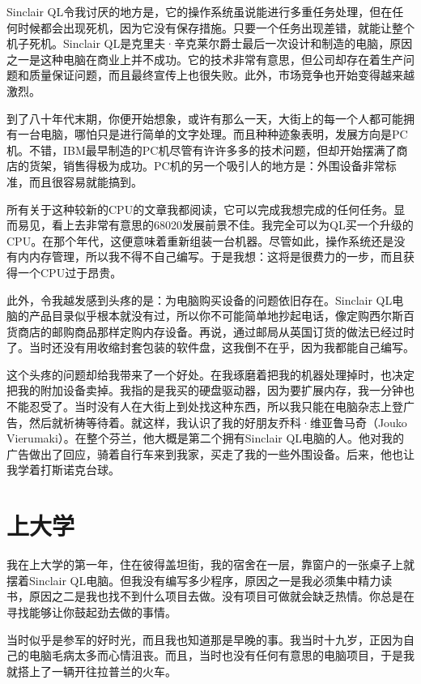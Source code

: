 Sinclair QL令我讨厌的地方是，它的操作系统虽说能进行多重任务处理，但在任何时候都会出现死机，因为它没有保存措施。只要一个任务出现差错，就能让整个机子死机。Sinclair QL是克里夫·辛克莱尔爵士最后一次设计和制造的电脑，原因之一是这种电脑在商业上并不成功。它的技术非常有意思，但公司却存在着生产问题和质量保证问题，而且最终宣传上也很失败。此外，市场竞争也开始变得越来越激烈。

到了八十年代末期，你便开始想象，或许有那么一天，大街上的每一个人都可能拥有一台电脑，哪怕只是进行简单的文字处理。而且种种迹象表明，发展方向是PC机。不错，IBM最早制造的PC机尽管有许许多多的技术问题，但却开始摆满了商店的货架，销售得极为成功。PC机的另一个吸引人的地方是：外围设备非常标准，而且很容易就能搞到。

所有关于这种较新的CPU的文章我都阅读，它可以完成我想完成的任何任务。显而易见，看上去非常有意思的68020发展前景不佳。我完全可以为QL买一个升级的CPU。在那个年代，这便意味着重新组装一台机器。尽管如此，操作系统还是没有内内存管理，所以我不得不自己编写。于是我想：这将是很费力的一步，而且获得一个CPU过于昂贵。

此外，令我越发感到头疼的是：为电脑购买设备的问题依旧存在。Sinclair QL电脑的产品目录似乎根本就没有过，所以你不可能简单地抄起电话，像定购西尔斯百货商店的邮购商品那样定购内存设备。再说，通过邮局从英国订货的做法已经过时了。当时还没有用收缩封套包装的软件盘，这我倒不在乎，因为我都能自己编写。

这个头疼的问题却给我带来了一个好处。在我琢磨着把我的机器处理掉时，也决定把我的附加设备卖掉。我指的是我买的硬盘驱动器，因为要扩展内存，我一分钟也不能忍受了。当时没有人在大街上到处找这种东西，所以我只能在电脑杂志上登广告，然后就祈祷等待着。就这样，我认识了我的好朋友乔科·维亚鲁马奇（Jouko Vierumaki）。在整个芬兰，他大概是第二个拥有Sinclair QL电脑的人。他对我的广告做出了回应，骑着自行车来到我家，买走了我的一些外围设备。后来，他也让我学着打斯诺克台球。

 
\section{上大学}

我在上大学的第一年，住在彼得盖坦街，我的宿舍在一层，靠窗户的一张桌子上就摆着Sinclair QL电脑。但我没有编写多少程序，原因之一是我必须集中精力读书，原因之二是我也找不到什么项目去做。没有项目可做就会缺乏热情。你总是在寻找能够让你鼓起劲去做的事情。

当时似乎是参军的好时光，而且我也知道那是早晚的事。我当时十九岁，正因为自己的电脑毛病太多而心情沮丧。而且，当时也没有任何有意思的电脑项目，于是我就搭上了一辆开往拉普兰的火车。

